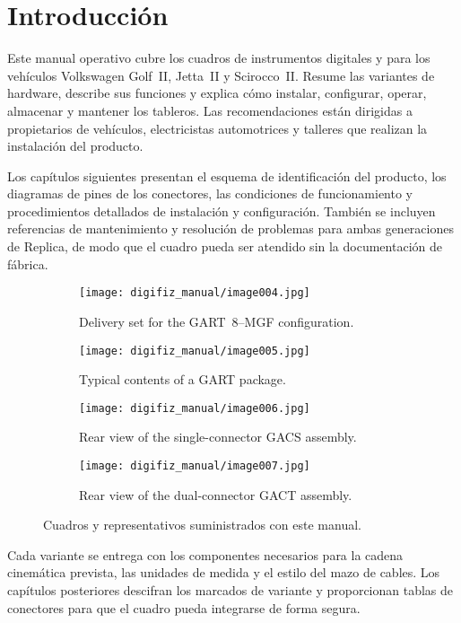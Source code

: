 \chapter{Introducción}\label{ch:introduction}

Este manual operativo cubre los cuadros de instrumentos digitales \ReplicaGenOne{} y \ReplicaNextLong{} para los vehículos Volkswagen Golf~II, Jetta~II y Scirocco~II. Resume las variantes de hardware, describe sus funciones y explica cómo instalar, configurar, operar, almacenar y mantener los tableros. Las recomendaciones están dirigidas a propietarios de vehículos, electricistas automotrices y talleres que realizan la instalación del producto.

Los capítulos siguientes presentan el esquema de identificación del producto, los diagramas de pines de los conectores, las condiciones de funcionamiento y procedimientos detallados de instalación y configuración. También se incluyen referencias de mantenimiento y resolución de problemas para ambas generaciones de Replica, de modo que el cuadro pueda ser atendido sin la documentación de fábrica.

\begin{figure}[htbp]
    \centering
    \begin{subfigure}{0.48\textwidth}
        \texttt{[image: digifiz\_manual/image004.jpg]}
        \caption{Delivery set for the GART~8--MGF configuration.}
    \end{subfigure}\hfill
    \begin{subfigure}{0.48\textwidth}
        \texttt{[image: digifiz\_manual/image005.jpg]}
        \caption{Typical contents of a GART package.}
    \end{subfigure}
    \begin{subfigure}{0.48\textwidth}
        \texttt{[image: digifiz\_manual/image006.jpg]}
        \caption{Rear view of the single-connector GACS assembly.}
    \end{subfigure}\hfill
    \begin{subfigure}{0.48\textwidth}
        \texttt{[image: digifiz\_manual/image007.jpg]}
        \caption{Rear view of the dual-connector GACT assembly.}
    \end{subfigure}
    \caption{Cuadros \ReplicaGenOne{} y \ReplicaNextLong{} representativos suministrados con este manual.}
\end{figure}

Cada variante se entrega con los componentes necesarios para la cadena cinemática prevista, las unidades de medida y el estilo del mazo de cables. Los capítulos posteriores descifran los marcados de variante y proporcionan tablas de conectores para que el cuadro pueda integrarse de forma segura.

